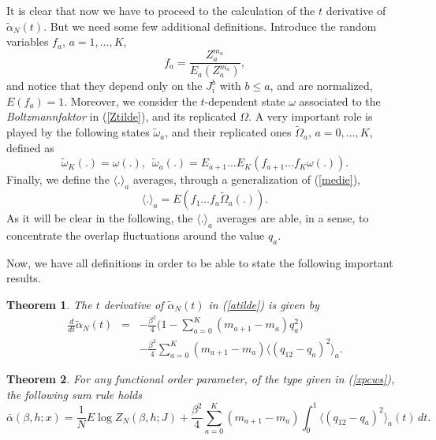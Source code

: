 \documentclass[a4paper,12pt]{article}
\newcommand{\med}[1]{\langle #1 \rangle}
\newtheorem{theorem}{Theorem}
\begin{document}
It is clear that now we have to proceed to the calculation of the $t$ 
derivative of $\tilde\alpha_N(t)$. But we need some few additional 
definitions. Introduce the random variables $f_a$, $a=1,\dots,K$,
\begin{equation}
\label{fa}
f_a=\frac{Z_{a}^{m_{a}}}{E_{a}(Z_{a}^{m_{a}})},
\end{equation}
and notice that they depend only on the $J^{b}_{i}$ with $b\le a$, and 
are normalized, $E(f_a)=1$. Moreover, we consider the $t$-dependent state $\omega$ 
associated to the {\it Boltzmannfaktor} in (\ref{Ztilde}), and its 
replicated $\Omega$. A very important role is played by the following 
states $\tilde\omega_a$, and their 
replicated ones $\tilde\Omega_a$, $a=0,\dots,K$, defined as
\begin{equation}\label{omegatildea}
\tilde\omega_K(.)=\omega(.),\,\,\, \tilde\omega_a(.)=E_{a+1}\dots 
E_{K}(f_{a+1}\dots f_{K}\omega(.)).
\end{equation}
Finally, we define the $\med{.}_a$ averages, through a generalization of 
(\ref{medie}),
\begin{equation}\label{mediea}
\med{.}_a=E(f_1 \dots f_a \tilde\Omega_{a}(.)).
\end{equation} 
As it will be clear in the following, the $\med{.}_a$ averages are able, in 
a sense, to concentrate the overlap fluctuations around the value $q_a$.

Now, we have all definitions in order to be able to state the following 
important results.

\begin{theorem}
\label{tdt}
The $t$ derivative of $\tilde\alpha_N(t)$ in (\ref{atilde}) is given by
\begin{eqnarray}
\nonumber
\frac{d}{dt}\tilde\alpha_N(t)&=&-\frac{\beta^2}{4}
\bigl(1-\sum_{a=0}^{K}(m_{a+1}-m_a)q^{2}_{a}\bigr)\\
\label{dt} 
&&-\frac{\beta^2}{4} \sum_{a=0}^{K}(m_{a+1}-m_a)\med{(q_{12}-q_{a})^{2}}_a.
\end{eqnarray}
\end{theorem}

\begin{theorem}
\label{tsum}
For any functional order parameter, of the type given in (\ref{xpcws}), 
the following sum rule holds
\begin{equation}
\label{sum}
\bar\alpha(\beta,h;x)=\frac{1}{N}E\log Z_{N}(\beta,h;J)+
\frac{\beta^2}{4} \sum_{a=0}^{K}(m_{a+1}-m_a)
\int_{0}^{1}\med{(q_{12}-q_{a})^{2}}_{a}(t)\,dt.
\end{equation}
\end{theorem}
\end{document}
